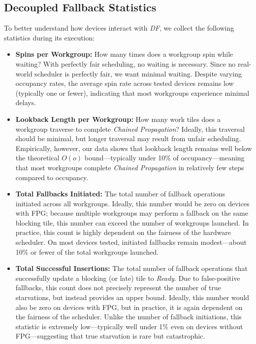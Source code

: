 \documentclass[acmsmall, manuscript, screen, review, anonymous]{acmart}
\begin{document}
\subsection{Decoupled Fallback Statistics}
To better understand how devices interact with \emph{DF}, we collect the following statistics during its execution:

\begin{itemize}
  \item \textbf{Spins per Workgroup:} How many times does a workgroup spin while waiting? With perfectly fair scheduling, no waiting is necessary. Since no real-world scheduler is perfectly fair, we want minimal waiting. Despite varying occupancy rates, the average spin rate across tested devices remains low (typically one or fewer), indicating that most workgroups experience minimal delays.

  \item \textbf{Lookback Length per Workgroup:} How many work tiles does a workgroup traverse to complete \emph{Chained Propagation}? Ideally, this traversal should be minimal, but longer traversal may result from unfair scheduling. Empirically, however, our data shows that lookback length remains well below the theoretical $O(o)$ bound---typically under 10\% of occupancy---meaning that most workgroups complete \emph{Chained Propagation} in relatively few steps compared to occupancy.

  \item \textbf{Total Fallbacks Initiated:} The total number of fallback operations initiated across all workgroups. Ideally, this number would be zero on devices with FPG; because multiple workgroups may perform a fallback on the same blocking tile, this number can exceed the number of workgroups launched. In practice, this count is highly dependent on the fairness of the hardware scheduler. On most devices tested, initiated fallbacks remain modest---about 10\% or fewer of the total workgroups launched.

  \item \textbf{Total Successful Insertions:} The total number of fallback operations that successfully update a blocking (or late) tile to \emph{Ready}. Due to false-positive fallbacks, this count does not precisely represent the number of true starvations, but instead provides an upper bound. Ideally, this number would also be zero on devices with FPG, but in practice, it is again dependent on the fairness of the scheduler. Unlike the number of fallback initiations, this statistic is extremely low---typically well under 1\% even on devices without FPG---suggesting that true starvation is rare but catastrophic.
\end{itemize}
\end{document}
